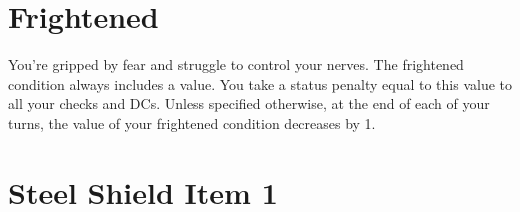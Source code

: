 \documentclass[paper=63mm:88mm, DIV=21, fontsize=7.5pt]{scrartcl}
\begin{document}
\pagestyle{empty}



\setlength\parindent{0pt} %
\setlength\parskip{4pt} %


\renewcommand*{\sectionformat}{}
\renewcommand*{\subsectionformat}{}

\newcommand{\Item}[2]{\section{#2 \hfill \color{gray} Item #1}}
\newcommand{\Action}[4]{\subsection[#4]{#4 \ActionSymbol{#3} \hfill \Reference{#1}{#2}}}

\newcommand{\Requirements}[1]{\paragraph{Requirements} #1.}

\newcommand{\Attribute}[2]{\smallskip\mbox{\engschrift \color{gray} #1 \normalcolor #2}}
\newcommand{\WeaponDamage}[1]{\Attribute{Damage}{#1}}
\newcommand{\ItemHands}[1]{\Attribute{Hands}{#1}}
\newcommand{\ItemBulk}[1]{\Attribute{Bulk}{#1}}
\newcommand{\ItemPrice}[1]{\Attribute{Price}{#1}}
\newcommand{\WeaponType}[1]{\Attribute{Type}{#1}}
\newcommand{\WeaponCategory}[1]{\Attribute{Category}{#1}}
\newcommand{\WeaponGroup}[1]{\Attribute{Group}{#1}}
\newcommand{\Flavor}[1]{\textit{#1}}

\newcommand{\Reference}[2]{{\small \color{gray} \engschrift #1 #2}}
\newcommand{\DamageType}[1]{\operatorname{\mbox{#1}}}


\section{Frightened}

You're gripped by fear and struggle to control your nerves.
The frightened condition always includes a value.
You take a status penalty equal to this value to all your checks and DCs.
Unless specified otherwise, at the end of each of your turns, the value of your frightened condition decreases by 1.

\Item{1}{Steel Shield}
\end{document}

